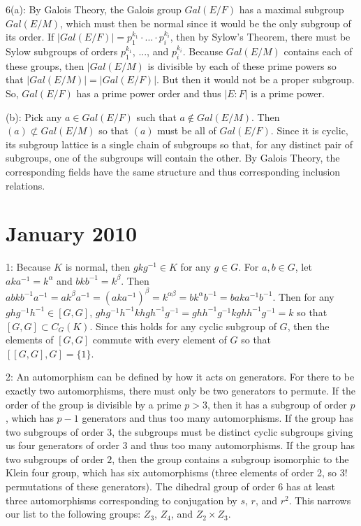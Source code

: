 \documentclass[12pt]{article}
\begin{document}
6(a): By Galois Theory, the Galois group $Gal(E/F)$ has a maximal subgroup $Gal(E/M)$, which must then be normal since it would be the only subgroup of its order. If $|Gal(E/F)|=p_1^{k_1} \cdot ... \cdot p_i^{k_i}$, then by Sylow's Theorem, there must be Sylow subgroups of orders $p_1^{k_1}$, ..., and $p_i^{k_i}$. Because $Gal(E/M)$ contains each of these groups, then $|Gal(E/M)$ is divisible by each of these prime powers so that $|Gal(E/M)|=|Gal(E/F)|$. But then it would not be a proper subgroup. So, $Gal(E/F)$ has a prime power order and thus $|E:F|$ is a prime power. \newline

(b): Pick any $a \in Gal(E/F)$ such that $a \notin Gal(E/M)$. Then $(a) \not \subset Gal(E/M)$ so that $(a)$ must be all of $Gal(E/F)$. Since it is cyclic, its subgroup lattice is a single chain of subgroups so that, for any distinct pair of subgroups, one of the subgroups will contain the other. By Galois Theory, the corresponding fields have the same structure and thus corresponding inclusion relations.

\section{January 2010}
1: Because $K$ is normal, then $gkg^{-1} \in K$ for any $g \in G$. For $a,b \in G$, let $aka^{-1}=k^\alpha$ and $bkb^{-1}=k^\beta$. Then $abkb^{-1}a^{-1}=ak^\beta a^{-1}=(aka^{-1})^\beta=k^{\alpha \beta}=bk^\alpha b^{-1}=baka^{-1}b^{-1}$. Then for any $ghg^{-1}h^{-1} \in [G,G]$, $ghg^{-1}h^{-1}khgh^{-1}g^{-1}=ghh^{-1}g^{-1}kghh^{-1}g^{-1}=k$ so that $[G,G] \subset C_G(K)$. Since this holds for any cyclic subgroup of $G$, then the elements of $[G,G]$ commute with every element of $G$ so that $[[G,G],G]=\{1\}$. \newline

2: An automorphism can be defined by how it acts on generators. For there to be exactly two automorphisms, there must only be two generators to permute. If the order of the group is divisible by a prime $p>3$, then it has a subgroup of order $p$, which has $p-1$ generators and thus too many automorphisms. If the group has two subgroups of order $3$, the subgroups must be distinct cyclic subgroups giving us four generators of order 3 and thus too many automorphisms. If the group has two subgroups of order $2$, then the group contains a subgroup isomorphic to the Klein four group, which has six automorphisms (three elements of order 2, so $3!$ permutations of these generators). The dihedral group of order 6 has at least three automorphisms corresponding to conjugation by $s$, $r$, and $r^2$. This narrows our list to the following groups: $Z_3$, $Z_4$, and $Z_2 \times Z_3$. \newline
\end{document}
